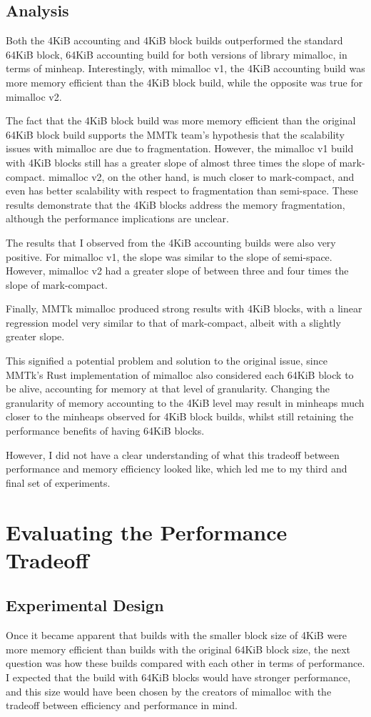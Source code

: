 \documentclass{article}
\begin{document}
\subsection{Analysis}
Both the 4KiB accounting and 4KiB block builds outperformed the standard 64KiB block, 64KiB accounting build for both versions of library mimalloc, in terms of minheap. Interestingly, with mimalloc v1, the 4KiB accounting build was more memory efficient than the 4KiB block build, while the opposite was true for mimalloc v2.

The fact that the 4KiB block build was more memory efficient than the original 64KiB block build supports the MMTk team's hypothesis that the scalability issues with mimalloc are due to fragmentation. However, the mimalloc v1 build with 4KiB blocks still has a greater slope of almost three times the slope of mark-compact. mimalloc v2, on the other hand, is much closer to mark-compact, and even has better scalability with respect to fragmentation than semi-space. These results demonstrate that the 4KiB blocks address the memory fragmentation, although the performance implications are unclear.

The results that I observed from the 4KiB accounting builds were also very positive. For mimalloc v1, the slope was similar to the slope of semi-space. However, mimalloc v2 had a greater slope of between three and four times the slope of mark-compact.

Finally, MMTk mimalloc produced strong results with 4KiB blocks, with a linear regression model very similar to that of mark-compact, albeit with a slightly greater slope.

This signified a potential problem and solution to the original issue, since MMTk's Rust implementation of mimalloc also considered each 64KiB block to be alive, accounting for memory at that level of granularity. Changing the granularity of memory accounting to the 4KiB level may result in minheaps much closer to the minheaps observed for 4KiB block builds, whilst still retaining the performance benefits of having 64KiB blocks.

However, I did not have a clear understanding of what this tradeoff between performance and memory efficiency looked like, which led me to my third and final set of experiments.

\section{Evaluating the Performance Tradeoff}
\subsection{Experimental Design}
Once it became apparent that builds with the smaller block size of 4KiB were more memory efficient than builds with the original 64KiB block size, the next question was how these builds compared with each other in terms of performance. I expected that the build with 64KiB blocks would have stronger performance, and this size would have been chosen by the creators of mimalloc with the tradeoff between efficiency and performance in mind.
\end{document}
